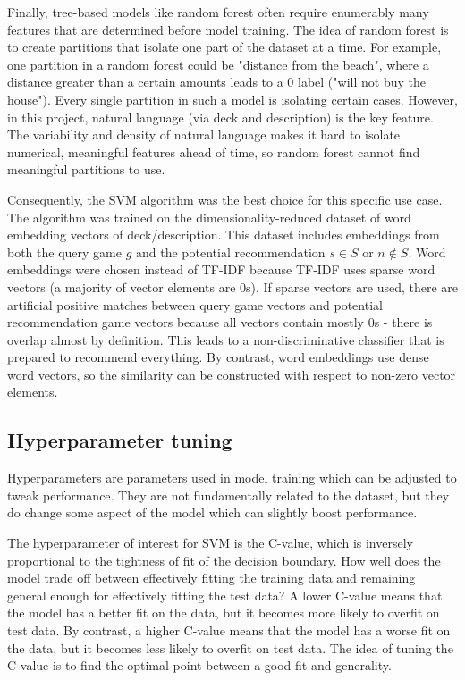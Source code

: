 \documentclass[10pt,twocolumn]{article}
\begin{document}
Finally, tree-based models like random forest often require enumerably many features that are determined before model training. The idea of random forest is to create partitions that isolate one part of the dataset at a time. For example, one partition in a random forest could be "distance from the beach", where a distance greater than a certain amounts leads to a 0 label ("will not buy the house"). Every single partition in such a model is isolating certain cases. However, in this project, natural language (via deck and description) is the key feature. The variability and density of natural language makes it hard to isolate numerical, meaningful features ahead of time, so random forest cannot find meaningful partitions to use.

Consequently, the SVM algorithm was the best choice for this specific use case. The algorithm was trained on the dimensionality-reduced dataset of word embedding vectors of deck/description. This dataset includes embeddings from both the query game $g$ and the potential recommendation $s \in S$ or $n \not\in S$. Word embeddings were chosen instead of TF-IDF because TF-IDF uses sparse word vectors (a majority of vector elements are 0s). If sparse vectors are used, there are artificial positive matches between query game vectors and potential recommendation game vectors because all vectors contain mostly 0s - there is overlap almost by definition. This leads to a non-discriminative classifier that is prepared to recommend everything. By contrast, word embeddings use dense word vectors, so the similarity can be constructed with respect to non-zero vector elements. 

\subsection{Hyperparameter tuning}
Hyperparameters are parameters used in model training which can be adjusted to tweak performance. They are not fundamentally related to the dataset, but they do change some aspect of the model which can slightly boost performance. 

The hyperparameter of interest for SVM is the C-value, which is inversely proportional to the tightness of fit of the decision boundary. How well does the model trade off between effectively fitting the training data and remaining general enough for effectively fitting the test data? A lower C-value means that the model has a better fit on the data, but it becomes more likely to overfit on test data. By contrast, a higher C-value means that the model has a worse fit on the data, but it becomes less likely to overfit on test data. The idea of tuning the C-value is to find the optimal point between a good fit and generality.
\end{document}
